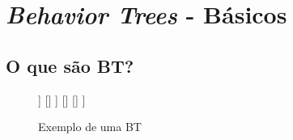 
\chapter{\textit{Behavior Trees} - Básicos} %

\label{Chapter2} %



\section{O que são BT?}


\begin{figure}[h]
\centering
\begin{behavior}
    [\sequence
        [\action{Walk to door}]
        [\selector
            [\action{Open door}]
            [\sequence
                [\action{Unlock door}]
                [\action{Open door}]
            ]
            []
        ]
        []
        []
    ]
\end{behavior}
\caption{Exemplo de uma BT}
\label{fig:M1}
\end{figure}








